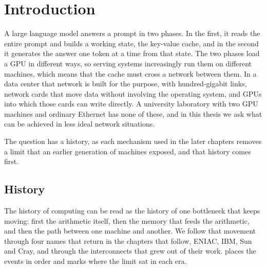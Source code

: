 \chapter{Introduction}
\label{ch:intro}

A large language model answers a prompt in two phases. In the first, it reads
the entire prompt and builds a working state, the key-value cache, and in the
second it generates the answer one token at a time from that state. The two
phases load a GPU in different ways, so serving systems increasingly run them
on different machines, which means that the cache must cross a network
between them. In a data center that network is built for the purpose, with
hundred-gigabit links, network cards that move data without involving the
operating system, and GPUs into which those cards can write directly. A
university laboratory with two GPU machines and ordinary Ethernet has none
of these, and in this thesis we ask what can be achieved in less ideal
network situations.

The question has a history, as each mechanism used in the later chapters
removes a limit that an earlier generation of machines exposed, and that
history comes first.

\section{History}
\label{sec:history}

The history of computing can be read as the history of one bottleneck that
keeps moving: first the arithmetic itself, then the memory that feeds the
arithmetic, and then the path between one machine and another. We follow
that movement through four names that return in the chapters that follow,
ENIAC, IBM, Sun and Cray, and through the interconnects that grew out of
their work.  places the events in order and marks where the limit sat in each era.

